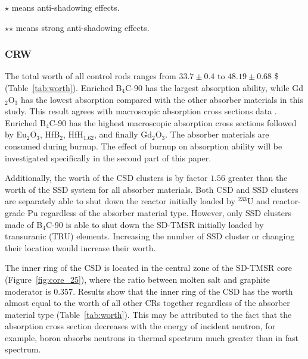 \begin{sidewaystable}
	\begin{tablenotes}
		\tiny
		\item  $\star$  means anti-shadowing effects.
		\item  $\star$$\star$ means strong anti-shadowing effects.
	\end{tablenotes}
	\label{tab:worth}
\end{sidewaystable}

\subsubsection{CRW} \label{CR_worth}

The total worth of all control rods ranges from $33.7\pm0.4$ to $48.19\pm0.68$ \$ (Table~\ref{tab:worth}). Enriched B$_4$C-90 has the largest absorption ability, while Gd$_2$O$_3$ has the lowest absorption compared with the other absorber materials in this study. This result agrees with macroscopic absorption cross sections data \cite{guo2019optimized}. Enriched B$_4$C-90 has the highest macroscopic absorption cross sections followed by Eu$_2$O$_3$, HfB$_2$, HfH$_{1.62}$, and finally Gd$_2$O$_3$. The absorber materials are consumed during burnup. The effect of burnup on absorption ability will be investigated specifically in the second part of this paper.

Additionally, the worth of the CSD clusters is by factor $1.56$ greater than the worth of the SSD system for all absorber materials. Both CSD and SSD clusters are separately able to shut down the reactor initially loaded by $^{233}$U and reactor-grade Pu regardless of the absorber material type. However, only SSD clusters made of B$_4$C-90 is able to shut down the SD-TMSR initially loaded by transuranic (TRU) elements. Increasing the number of SSD cluster or changing their location would increase their worth.

The inner ring of the CSD is located in the central zone of the SD-TMSR core (Figure~\ref{fig:core_25}), where the ratio between molten salt and graphite moderator is $0.357$. Results show that the inner ring of the CSD has the worth almost equal to the worth of all other CRs together regardless of the absorber material type (Table~\ref{tab:worth}). This may be attributed to the fact that the absorption cross section decreases with the energy of incident neutron, for example, boron absorbs neutrons in thermal spectrum much greater than in fast spectrum.

